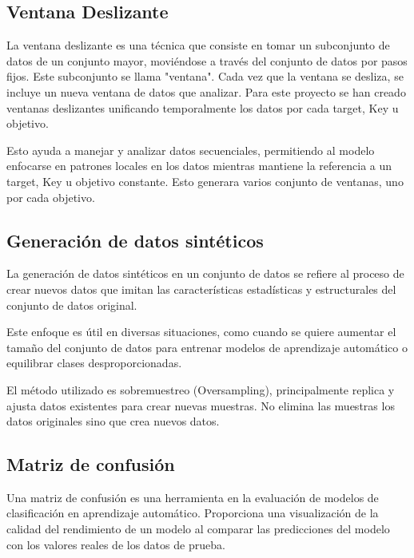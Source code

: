 \subsection{Ventana Deslizante}

	
La ventana deslizante es una técnica que consiste en tomar un subconjunto de datos de un conjunto mayor, moviéndose a través del conjunto de datos por pasos fijos. Este subconjunto se llama "ventana". Cada vez que la ventana se desliza, se incluye un nueva ventana de datos que analizar. Para este proyecto se han creado ventanas deslizantes unificando temporalmente los datos por cada target, Key u objetivo.

Esto ayuda a manejar y analizar datos secuenciales, permitiendo al modelo enfocarse en patrones locales en los datos mientras mantiene la referencia a un target, Key u objetivo constante. Esto generara varios conjunto de ventanas, uno por cada objetivo.


	
	
\subsection{Generación de datos sintéticos}

	La generación de datos sintéticos en un conjunto de datos se refiere al proceso de crear nuevos datos que imitan las características estadísticas y estructurales del conjunto de datos original. 
	
	Este enfoque es útil en diversas situaciones, como cuando se quiere aumentar el tamaño del conjunto de datos para entrenar modelos de aprendizaje automático o equilibrar clases desproporcionadas.
	
	El método utilizado es sobremuestreo (Oversampling), principalmente replica y ajusta datos existentes para crear nuevas muestras. No elimina las muestras los datos originales sino que crea nuevos datos.

\subsection{Matriz de confusión}

Una matriz de confusión es una herramienta en la evaluación de modelos de clasificación en aprendizaje automático. Proporciona una visualización de la calidad del rendimiento de un modelo al comparar las predicciones del modelo con los valores reales de los datos de prueba.

